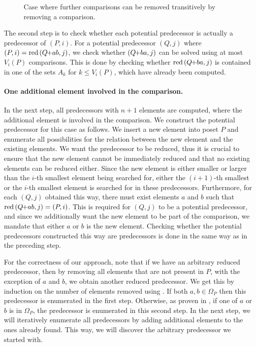 \documentclass[twoside,leqno,twocolumn]{article}
\newcommand{\pchild}[3]{{#1}\kern-1pt{+}{#2}{#3}}
\newcommand{\reduced}[1]{\operatorname{red}{#1}}
\begin{document}
\begin{figure}[!b]
  \centering
  
  \caption{Case where further comparisons can be removed transitively by removing a comparison.}
  \label{fig:backward_problematic}
\end{figure}

The second step is to check whether each potential predecessor is actually a predecessor of $(P, i)$.
For a potential predecessor $(Q, j)$ where $(P, i) = \reduced{(\pchild{Q}{a}{b}, j)}$, we check whether $(\pchild{Q}{b}{a}, j)$ can be solved using at most $V_i(P)$ comparisons.
This is done by checking whether $\reduced{(\pchild{Q}{b}{a}, j)}$ is contained in one of the sets $A_k$ for $k \leq V_i(P)$, which have already been computed.


\paragraph{One additional element involved in the comparison.}
In the next step, all predecessors with $n + 1$ elements are computed, where the additional element is involved in the comparison.
We construct the potential predecessor for this case as follows.
We insert a new element into poset $P$ and enumerate all possibilities for the relation between the new element and the existing elements.
We want the predecessor to be reduced, thus it is crucial to ensure that the new element cannot be immediately reduced and that no existing elements can be reduced either.
Since the new element is either smaller or larger than the $i$-th smallest element being searched for, either the $(i + 1)$-th smallest or the $i$-th smallest element is searched for in these predecessors.
Furthermore, for each $(Q, j)$ obtained this way, there must exist elements $a$ and $b$ such that $\reduced{(\pchild{Q}{a}{b}, j)} = (P, i)$.
This is required for $(Q, j)$ to be a potential predecessor, and since we additionally want the new element to be part of the comparison, we mandate that either $a$ or $b$ is the new element.
Checking whether the potential predecessors constructed this way are predecessors is done in the same way as in the preceding step.

For the correctness of our approach, note that if we have an arbitrary reduced predecessor, then by removing all elements that are not present in $P$, with the exception of $a$ and $b$, we obtain another reduced predecessor.
We get this by induction on the number of elements removed using .
If both $a, b \in \Omega_P$ then this predecessor is enumerated in the first step.
Otherwise, as proven in , if one of $a$ or $b$ is in $\Omega_P$, the predecessor is enumerated in this second step.
In the next step, we will iteratively enumerate all predecessors by adding additional elements to the ones already found.
This way, we will discover the arbitrary predecessor we started with.
\end{document}
